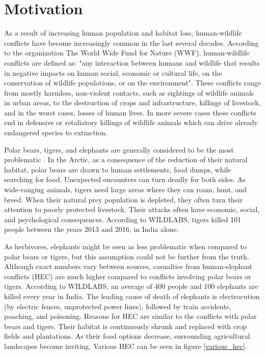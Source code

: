 \section{ Motivation}

As a result of increasing human population and habitat loss, human-wildlife conflicts have become increasingly common in the last several decades\cite{philip-wildlife}.
According to the organization The World Wide Fund for Nature (WWF), human-wildlife conflicts are defined as: "any interaction between humans and wildlife that results in negative impacts on human social, economic or cultural life, on the conservation of wildlife populations, or on the environment"\cite{conflict-manual}.
These conflicts range from mostly harmless, non-violent contacts, such as sightings of wildlife animals in urban areas, to the destruction of crops and infrastructure, killings of livestock, and in the worst cases, losses of human lives.
In more severe cases these conflicts end in defensive or retaliatory killings of wildlife animals which can drive already endangered species to extinction.

Polar bears, tigers, and elephants are generally considered to be the most problematic \cite{philip-wildlife}.
In the Arctic, as a consequence of the reduction of their natural habitat, polar bears are drawn to human settlements, food dumps, while searching for food\cite{wildlabs-polarbears}.
Unexpected encounters can turn deadly for both sides.
As wide-ranging animals, tigers need large areas where they can roam, hunt, and breed\cite{wildlabs-tigers}.
When their natural prey population is depleted, they often turn their attention to poorly protected livestock. 
Their attacks often have economic, social, and psychological consequences.
According to WILDLABS, tigers killed 101 people between the years 2013 and 2016, in India alone\cite{wildlabs-tigers}.

As herbivores, elephants might be seen as less problematic when compared to polar bears or tigers, but this assumption could not be further from the truth.
Although exact numbers vary between sources, casualties from human-elephant conflicts (HEC) are much higher compared to conflicts involving polar bears or tigers.
According to WILDLABS, an average of 400 people and 100 elephants are killed every year in India\cite{wildlabs-elephants}. 
The leading cause of death of elephants is electrocution (by electric fences, unprotected power lines), followed by train accidents, poaching, and poisoning\cite{cause-of-death}.
Reasons for HEC are similar to the conflicts with polar bears and tigers.
Their habitat is continuously shrunk and replaced with crop fields and plantations.
As their food options decrease, surrounding agricultural landscapes become inviting.  
Various HEC can be seen in figure \ref{various_hec}.

